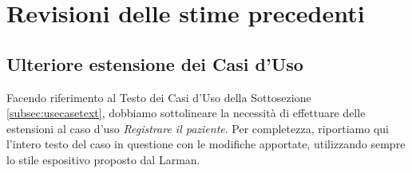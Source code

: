 \chapter{Revisioni delle stime precedenti}
\minitoc\mtcskip

\section{Ulteriore estensione dei Casi d'Uso}
Facendo riferimento al Testo dei Casi d'Uso della Sottosezione \vref{subsec:usecasetext},
dobbiamo sottolineare la necessità di effettuare delle estensioni al caso d'uso
\textit{Registrare il paziente}. Per completezza, riportiamo qui l'intero testo
del caso in questione con le modifiche apportate, utilizzando sempre lo stile espositivo
proposto dal Larman.


